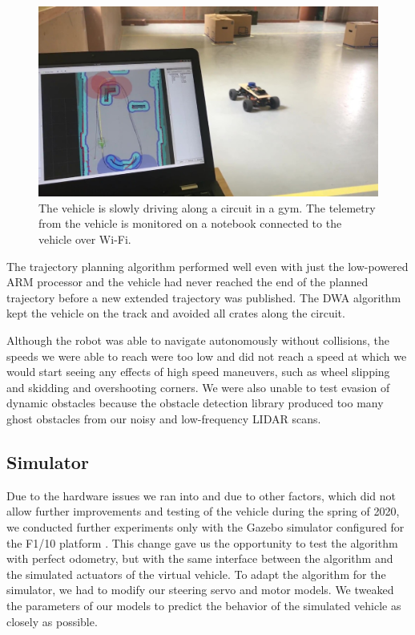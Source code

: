 \begin{figure}
	\label{fig:real-world-testing-driving}
	\centering
	\includegraphics[width=\textwidth]{../img/experiments/real-world-driving.jpg}
	\caption{The vehicle is slowly driving along a circuit in a gym. The telemetry from the vehicle is monitored on a notebook connected to the vehicle over Wi-Fi.}
\end{figure}

The trajectory planning algorithm performed well even with just the low-powered ARM processor and the vehicle had never reached the end of the planned trajectory before a new extended trajectory was published. The \gls{DWA} algorithm kept the vehicle on the track and avoided all crates along the circuit.

Although the robot was able to navigate autonomously without collisions, the speeds we were able to reach were too low and did not reach a speed at which we would start seeing any effects of high speed maneuvers, such as wheel slipping and skidding and overshooting corners. We were also unable to test evasion of dynamic obstacles because the obstacle detection library produced too many ghost obstacles from our noisy and low-frequency \gls*{LIDAR} scans.

\subsection{Simulator}
Due to the hardware issues we ran into and due to other factors, which did not allow further improvements and testing of the vehicle during the spring of 2020, we conducted further experiments only with the Gazebo simulator \cite{gazebo} configured for the F1/10 platform \cite{varundev_ros_19}. This change gave us the opportunity to test the algorithm with perfect odometry, but with the same interface between the algorithm and the simulated actuators of the virtual vehicle. To adapt the algorithm for the simulator, we had to modify our steering servo and motor models. We tweaked the parameters of our models to predict the behavior of the simulated vehicle as closely as possible.

